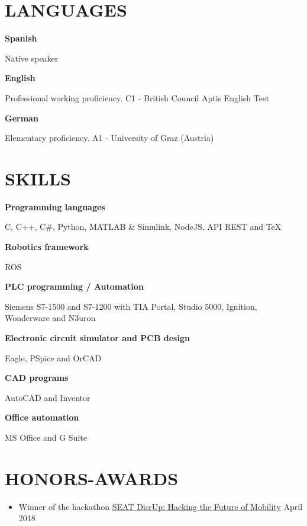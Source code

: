 \documentclass[10pt,a4paper,oneside]{book}
\newcommand{\sepspace}{\vspace*{0pt}}		%
\newcommand{\NewPart}[2]{\section*{\uppercase{#1} #2}}
\newcommand{\EducationEntrya}[4]{\noindent\ignorespaces	
		\begin{minipage}[t][][b]{0.8\textwidth} \raggedright{\textbf{#1}} \end{minipage} \hfill 
		\begin{minipage}[t][][b]{0.2\textwidth} \hfill\color{Black}#2\end{minipage} 
		 
		\noindent \textit{#3} \par        %
		\noindent\hangindent=2em\hangafter=0 \small #4 
		\normalsize \par}
\newcommand{\LanguageEntry}[2]{\noindent\ignorespaces
\textbf{#1}	\par
\noindent \small #2 \par
}
\newcommand{\ITSkillEntry}[2]{\noindent\ignorespaces
\textbf{#1}	\par
\noindent \small #2 \par
}
\begin{document}
\sepspace


\NewPart{Languages}{}
\LanguageEntry{Spanish}{Native speaker}
\sepspace
\LanguageEntry{English}{Professional working proficiency. C1 - British Council Aptis English Test}
\sepspace
\LanguageEntry{German}{Elementary proficiency. A1 - University of Graz (Austria)}

\NewPart{Skills}{}
\ITSkillEntry{Programming languages}{C,  C++, C\#, Python, MATLAB \& Simulink, NodeJS, API REST and \TeX}
\ITSkillEntry{Robotics framework}{ROS}
\sepspace
\ITSkillEntry{PLC programming / Automation}{Siemens S7-1500 and S7-1200 with TIA Portal, Studio 5000, Ignition, Wonderware and N3uron}
\sepspace
\ITSkillEntry{Electronic circuit simulator and PCB design}{Eagle, PSpice and OrCAD}
\sepspace
\ITSkillEntry{CAD programs}{AutoCAD and Inventor}
\sepspace
\ITSkillEntry{Office automation}{MS Office and G Suite}


\NewPart{Honors-Awards}{}
\begin{itemize}
    \item Winner of the hackathon \href{https://www.seatdisrup.com/}{SEAT DisrUp: Hacking the Future of Mobility} \hfill April 2018
\end{itemize}
\end{document}

